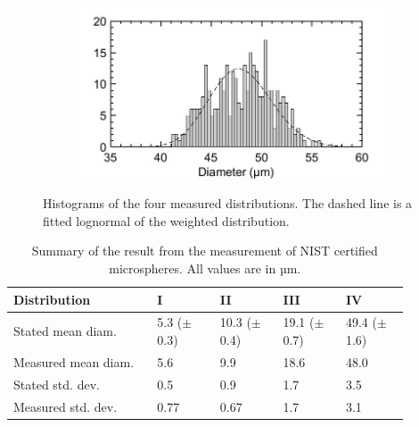 \begin{figure}[ht]
\begin{subfigure}{.5\textwidth}
  \label{fig:Meas1_20um}
\end{subfigure}
\begin{subfigure}{.49\textwidth}
  \centering
  \includegraphics[width=1\linewidth]{figures/Images/Measurement1_50um}
  \label{fig:Meas1_50um}
\end{subfigure}
\caption{Histograms of the four measured distributions. The dashed line is a fitted  lognormal of the weighted distribution.}
\label{fig:Histograms}
\end{figure}

\begin{table}[ht]
\centering
\begin{tabular}{p{0.32\linewidth} p{0.14\linewidth} p{0.14\linewidth} p{0.14\linewidth} p{0.14\linewidth}}
\hline
\textbf{Distribution} & \textbf{I} & \textbf{II} & \textbf{III} & \textbf{IV}\\
\hline
Stated mean diam. & 5.3\newline \hspace{1em} ($\pm$ 0.3) & 10.3\newline \hspace{1em} ($\pm$ 0.4) & 19.1\newline \hspace{1em} ($\pm$ 0.7) & 49.4\newline \hspace{1em} ($\pm$ 1.6) \\
Measured mean diam. & 5.6 & 9.9 & 18.6 & 48.0 \\
\hline
Stated std. dev. & 0.5 & 0.9 & 1.7 & 3.5 \\
Measured std. dev. & 0.77 & 0.67 & 1.7 & 3.1 \\
\hline
\end{tabular}
\caption{Summary of the result from the measurement of NIST certified microspheres. All values are in µm.}
\label{tab:poly_meas}
\end{table}

